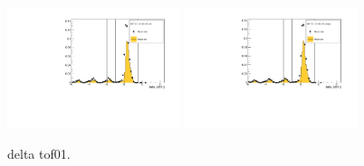 \begin{figure}[!tbh]
    \includegraphics*[width=0.45\textwidth]{02-Cuts/Figures/2017-2.7_10-140_lH2_full/tof_delta_tof01_us_cut.pdf}
    \includegraphics*[width=0.45\textwidth]{02-Cuts/Figures/2017-2.7_10-140_lH2_empty/tof_delta_tof01_us_cut.pdf}
    \caption{delta tof01.
\label{fig:delta_tof01}}
\end{figure}


